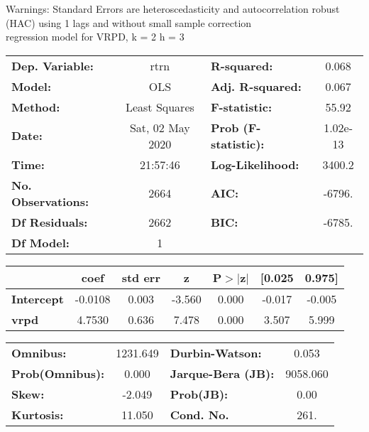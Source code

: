 Warnings: \newline
 [1] Standard Errors are heteroscedasticity and autocorrelation robust (HAC) using 1 lags and without small sample correction\\ 

regression model for VRPD, k = 2 h = 3\begin{center}
\begin{tabular}{lclc}
\toprule
\textbf{Dep. Variable:}    &       rtrn       & \textbf{  R-squared:         } &     0.068   \\
\textbf{Model:}            &       OLS        & \textbf{  Adj. R-squared:    } &     0.067   \\
\textbf{Method:}           &  Least Squares   & \textbf{  F-statistic:       } &     55.92   \\
\textbf{Date:}             & Sat, 02 May 2020 & \textbf{  Prob (F-statistic):} &  1.02e-13   \\
\textbf{Time:}             &     21:57:46     & \textbf{  Log-Likelihood:    } &    3400.2   \\
\textbf{No. Observations:} &        2664      & \textbf{  AIC:               } &    -6796.   \\
\textbf{Df Residuals:}     &        2662      & \textbf{  BIC:               } &    -6785.   \\
\textbf{Df Model:}         &           1      & \textbf{                     } &             \\
\bottomrule
\end{tabular}
\begin{tabular}{lcccccc}
                   & \textbf{coef} & \textbf{std err} & \textbf{z} & \textbf{P$> |$z$|$} & \textbf{[0.025} & \textbf{0.975]}  \\
\midrule
\textbf{Intercept} &      -0.0108  &        0.003     &    -3.560  &         0.000        &       -0.017    &       -0.005     \\
\textbf{vrpd}      &       4.7530  &        0.636     &     7.478  &         0.000        &        3.507    &        5.999     \\
\bottomrule
\end{tabular}
\begin{tabular}{lclc}
\textbf{Omnibus:}       & 1231.649 & \textbf{  Durbin-Watson:     } &    0.053  \\
\textbf{Prob(Omnibus):} &   0.000  & \textbf{  Jarque-Bera (JB):  } & 9058.060  \\
\textbf{Skew:}          &  -2.049  & \textbf{  Prob(JB):          } &     0.00  \\
\textbf{Kurtosis:}      &  11.050  & \textbf{  Cond. No.          } &     261.  \\
\bottomrule
\end{tabular}
\end{center}

